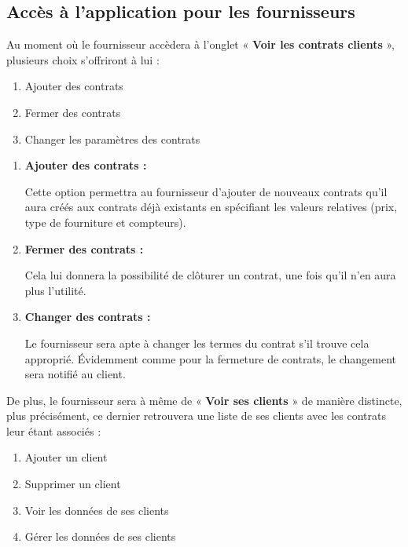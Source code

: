 \subsection{Accès à l'application pour les fournisseurs}

Au moment où le fournisseur accèdera à l’onglet \newline « \textbf{Voir les contrats clients} », plusieurs choix s’offriront à lui :
\begin{enumerate}[1.]
\item Ajouter des contrats
\item Fermer des contrats
\item Changer les paramètres des contrats
\end{enumerate}

\begin{enumerate}[-]
\item \textbf{Ajouter des contrats :} \newline

Cette option permettra au fournisseur d’ajouter de nouveaux contrats qu’il aura créés aux contrats déjà existants en spécifiant les valeurs relatives (prix, type de fourniture et compteurs).


\item \textbf{Fermer des contrats : }\newline

Cela lui donnera la possibilité de clôturer un contrat, une fois qu’il n’en aura plus l’utilité.

\item \textbf{Changer des contrats : }\newline

Le fournisseur sera apte à changer les termes du contrat s’il trouve cela approprié.\newline
Évidemment comme pour la fermeture de contrats, le changement sera notifié au client.
\end{enumerate}

\newpage
\begin{flushleft}
De plus, le fournisseur sera à même de « \textbf{Voir ses clients} » de manière distincte, plus précisément, ce dernier retrouvera une liste de ses clients avec les contrats leur étant associés :
\end{flushleft}
\begin{enumerate}[1.]
\item Ajouter un client
\item Supprimer un client
\item Voir les données de ses clients
\item Gérer les données de ses clients
\end{enumerate}

